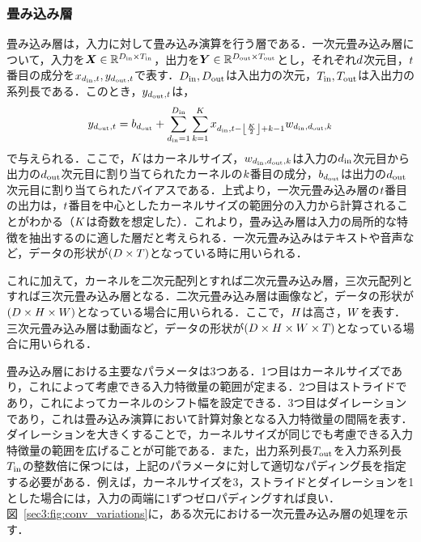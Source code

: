 \subsubsection{畳み込み層}
畳み込み層は，入力に対して畳み込み演算を行う層である．一次元畳み込み層について，入力を$\bm{X} \in \mathbb{R}^{D_{\text{in}} \times T_{\text{in}}}$，出力を$\bm{Y} \in \mathbb{R}^{D_{\text{out}} \times T_{\text{out}}}$とし，それぞれ$d$次元目，$t$番目の成分を$x_{d_{\text{in}}, t}, y_{d_{\text{out}}, t}$で表す．$D_{\text{in}}, D_{\text{out}}$は入出力の次元，$T_{\text{in}}, T_{\text{out}}$は入出力の系列長である．このとき，$y_{d_{\text{out}}, t}$は，
\begin{align}
    y_{d_{\text{out}}, t} = b_{d_{\text{out}}} + \sum_{d_{\text{in}} = 1}^{D_{\text{in}}} \sum_{k = 1}^{K} x_{d_{\text{in}}, t - \left\lfloor\frac{K}{2}\right\rfloor + k - 1} w_{d_{\text{in}}, d_{\text{out}}, k}
\end{align}
で与えられる．ここで，$K$はカーネルサイズ，$w_{d_{\text{in}}, d_{\text{out}}, k}$は入力の$d_{\text{in}}$次元目から出力の$d_{\text{out}}$次元目に割り当てられたカーネルの$k$番目の成分，$b_{d_{\text{out}}}$は出力の$d_{\text{out}}$次元目に割り当てられたバイアスである．上式より，一次元畳み込み層の$t$番目の出力は，$t$番目を中心としたカーネルサイズの範囲分の入力から計算されることがわかる（$K$は奇数を想定した）．これより，畳み込み層は入力の局所的な特徴を抽出するのに適した層だと考えられる．一次元畳み込みはテキストや音声など，データの形状が$\left(D \times T\right)$となっている時に用いられる．

これに加えて，カーネルを二次元配列とすれば二次元畳み込み層，三次元配列とすれば三次元畳み込み層となる．二次元畳み込み層は画像など，データの形状が$\left(D \times H \times W\right)$となっている場合に用いられる．ここで，$H$は高さ，$W$を表す．三次元畳み込み層は動画など，データの形状が$\left(D \times H \times W \times T\right)$となっている場合に用いられる．

畳み込み層における主要なパラメータは3つある．1つ目はカーネルサイズであり，これによって考慮できる入力特徴量の範囲が定まる．2つ目はストライドであり，これによってカーネルのシフト幅を設定できる．3つ目はダイレーションであり，これは畳み込み演算において計算対象となる入力特徴量の間隔を表す．ダイレーションを大きくすることで，カーネルサイズが同じでも考慮できる入力特徴量の範囲を広げることが可能である．また，出力系列長$T_{\text{out}}$を入力系列長$T_{\text{in}}$の整数倍に保つには，上記のパラメータに対して適切なパディング長を指定する必要がある．例えば，カーネルサイズを3，ストライドとダイレーションを1とした場合には，入力の両端に1ずつゼロパディングすれば良い．図~\ref{sec3:fig:conv_variations}に，ある次元における一次元畳み込み層の処理を示す．

